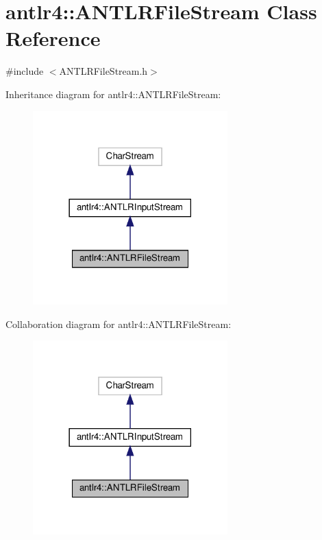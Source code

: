 \hypertarget{classantlr4_1_1ANTLRFileStream}{}\section{antlr4\+:\+:A\+N\+T\+L\+R\+File\+Stream Class Reference}
\label{classantlr4_1_1ANTLRFileStream}


{\ttfamily \#include $<$A\+N\+T\+L\+R\+File\+Stream.\+h$>$}



Inheritance diagram for antlr4\+:\+:A\+N\+T\+L\+R\+File\+Stream\+:
\nopagebreak
\begin{figure}[H]
\begin{center}
\leavevmode
\includegraphics[width=213pt]{classantlr4_1_1ANTLRFileStream__inherit__graph}
\end{center}
\end{figure}


Collaboration diagram for antlr4\+:\+:A\+N\+T\+L\+R\+File\+Stream\+:
\nopagebreak
\begin{figure}[H]
\begin{center}
\leavevmode
\includegraphics[width=213pt]{classantlr4_1_1ANTLRFileStream__coll__graph}
\end{center}
\end{figure}
